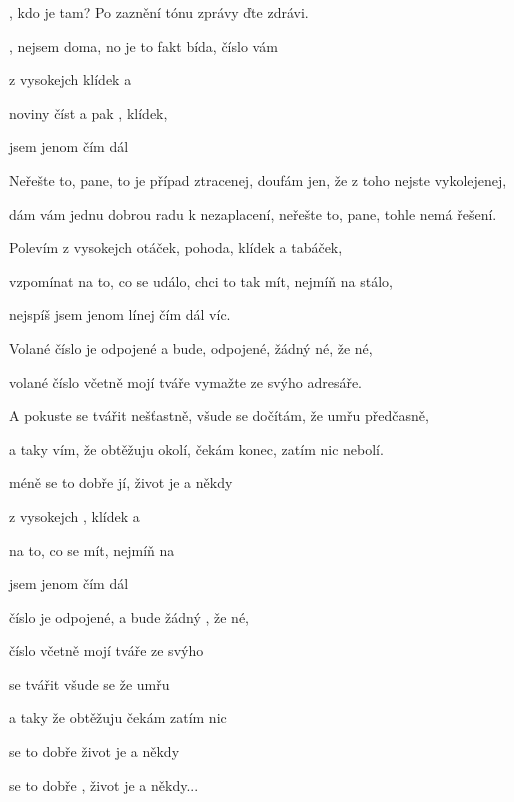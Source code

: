 
\zs
{}, kdo je tam? Po zaznění tónu
 zprávy ďte zdrávi.

, nejsem doma, no je to fakt bída,
 číslo vám 
\ks

\zr
{} z vysokejch 
 klídek a 

 {noviny} číst a pak ,
 klídek, 

 jsem jenom  čím dál 
\kr

\zs
Neřešte to, pane, to je případ ztracenej,
doufám jen, že z toho nejste vykolejenej,

dám vám jednu dobrou radu k nezaplacení,
neřešte to, pane, tohle nemá řešení.

\ks

\zr
Polevím z vysokejch otáček,
pohoda, klídek a tabáček,

vzpomínat na to, co se událo,
chci to tak mít, nejmíň na stálo,

nejspíš jsem jenom línej čím dál víc.
\kr

\zs
Volané číslo je odpojené a bude,
odpojené, žádný né, že né,

volané číslo včetně mojí tváře
vymažte ze svýho adresáře.

\ks

\zr
A pokuste se tvářit nešťastně,
všude se dočítám, že umřu předčasně,

a taky vím, že obtěžuju okolí,
čekám konec, zatím nic nebolí.

méně se to dobře jí,
život je  a někdy 
\kr


  
  

\zr
{} z vysokejch 
, klídek a 

 na to, co se 
 mít, nejmíň na 

 jsem jenom  čím dál 
\kr

\zs
{} číslo je odpojené,
a bude  žádný , že né,

 číslo včetně mojí tváře
 ze svýho 

\ks

\zs
{} se tvářit 
všude se  že umřu 

a taky  že obtěžuju 
čekám  zatím nic 
\ks

\zs
{} se to dobře 
život je  a někdy 

 se to dobře ,
život je  a někdy...
\ks
\kp
